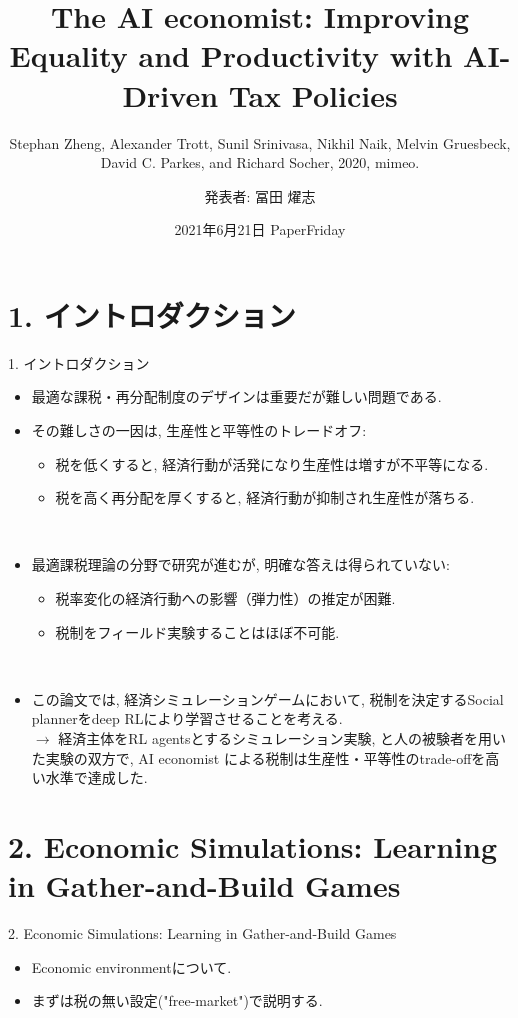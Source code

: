 \documentclass[unicode,aspectratio=169,11pt]{beamer}
\title{
    The AI economist:
    Improving Equality and Productivity with AI-Driven Tax Policies
}
\subtitle{Stephan Zheng, Alexander Trott, Sunil Srinivasa, Nikhil Naik, Melvin Gruesbeck, David C. Parkes, and Richard Socher, 2020, mimeo.}
\author{発表者: 冨田 燿志}
\date{2021年6月21日 PaperFriday}
\begin{document}
\maketitle

\section{1. イントロダクション}
\begin{frame}{1. イントロダクション}
    \begin{itemize}
        \item 最適な課税・再分配制度のデザインは重要だが難しい問題である.
        \item その難しさの一因は, 生産性と平等性のトレードオフ:
        \begin{itemize}
            \item 税を低くすると, 経済行動が活発になり生産性は増すが不平等になる.
            \item 税を高く再分配を厚くすると, 経済行動が抑制され生産性が落ちる.
        \end{itemize}
        　\\
        \item 最適課税理論の分野で研究が進むが, 明確な答えは得られていない:
        \begin{itemize}
            \item 税率変化の経済行動への影響（弾力性）の推定が困難.
            \item 税制をフィールド実験することはほぼ不可能.
        \end{itemize}
        　\\
        \item この論文では, 経済シミュレーションゲームにおいて, 税制を決定するSocial plannerをdeep RLにより学習させることを考える.\\
        $\to$ 経済主体をRL agentsとするシミュレーション実験, と人の被験者を用いた実験の双方で, AI economist による税制は生産性・平等性のtrade-offを高い水準で達成した.
    \end{itemize}
\end{frame}

\section{2. Economic Simulations: Learning in Gather-and-Build Games}

\begin{frame}{2. Economic Simulations: Learning in Gather-and-Build Games}{}
    \begin{itemize}
        \item Economic environmentについて.
        \item まずは税の無い設定("free-market")で説明する.
    \end{itemize}
\end{frame}
\end{document}
